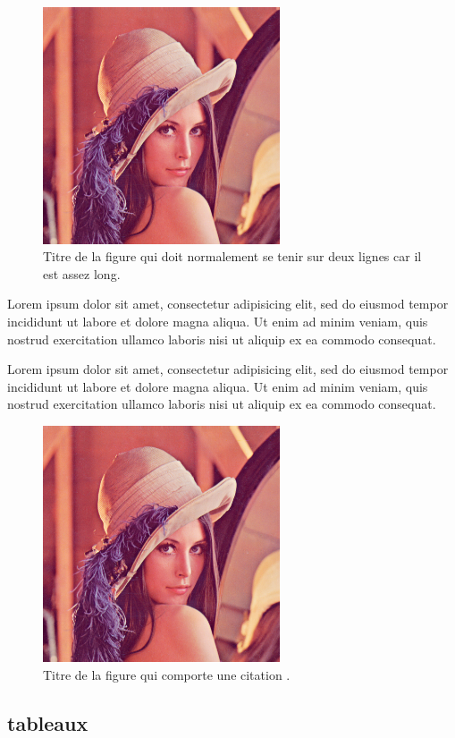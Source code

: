 \begin{figure}[H]
 \centering
 \includegraphics[width=7cm]{lenna.png}
 \caption{Titre de la figure qui doit normalement se tenir sur deux lignes car il est assez long.}
 \label{fig:figure1}
\end{figure}

Lorem ipsum dolor sit amet, consectetur adipisicing elit, sed do eiusmod
tempor incididunt ut labore et dolore magna aliqua. Ut enim ad minim veniam,
quis nostrud exercitation ullamco laboris nisi ut aliquip ex ea commodo
consequat.

Lorem ipsum dolor sit amet, consectetur adipisicing elit, sed do eiusmod
tempor incididunt ut labore et dolore magna aliqua. Ut enim ad minim veniam,
quis nostrud exercitation ullamco laboris nisi ut aliquip ex ea commodo
consequat.

\begin{figure}[H]
  \centering
  \includegraphics[width=7cm]{lenna.png}
  \caption[Titre de la figure sans citation]{Titre de la figure qui comporte une citation \citep{Ful83}.}
  \label{fig:figure1}
 \end{figure}

\subsection{tableaux}

